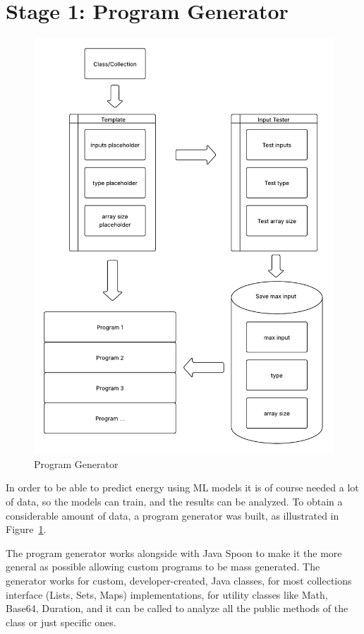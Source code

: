 \section{Stage 1: Program Generator} \label{sec:work_stage1_program_generator}

\begin{figure}[htbp]%
  \centering
  \includegraphics[width = 1 \textwidth]{figures/program_generator.pdf}
  \caption{Program Generator}
  \label{fig:program_generator}
\end{figure}

In order to be able to predict energy using ML models it is of course needed a lot of data, so the models can train, and the results can be analyzed. To obtain a considerable amount of data, a program generator was built, as illustrated in Figure~\ref{fig:program_generator}.

The program generator works alongside with Java Spoon to make it the more general as possible allowing custom programs to be mass generated.
The generator works for custom, developer-created, Java classes, for most collections interface (Lists, Sets, Maps) implementations, for utility classes like Math, Base64, Duration, and it can be called to analyze all the public methods of the class or just specific ones.

